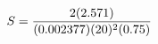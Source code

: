 \documentclass[preview]{standalone}
\begin{document}
\begin{align*}
\special{dvisvgm:raw <g id='unique000'>}S = \frac{2(2.571)}{(0.002377)(20)^2(0.75)}\special{dvisvgm:raw </g>}
\end{align*}
\end{document}
